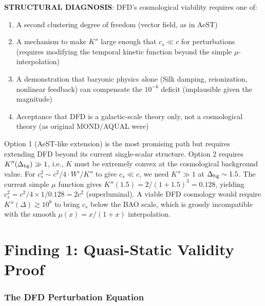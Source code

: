 \documentclass[11pt]{article}
\begin{document}
\begin{tcolorbox}[colback=blue!5!white, colframe=blue!70!black,
  title=\textbf{W4i18 TOP 5 FINDINGS --- QUASI-STATIC REGIME PROOF}]
\begin{enumerate}
  \textbf{STRUCTURAL DIAGNOSIS}: DFD's cosmological viability requires
  one of:
  \begin{enumerate}[nosep]
  \item A second clustering degree of freedom (vector field, as in AeST)
  \item A mechanism to make $K''$ large enough that $c_s \ll c$ for
    perturbations (requires modifying the temporal kinetic function
    beyond the simple $\mu$-interpolation)
  \item A demonstration that baryonic physics alone (Silk damping,
    reionization, nonlinear feedback) can compensate the $10^{-6}$
    deficit (implausible given the magnitude)
  \item Acceptance that DFD is a galactic-scale theory only, not a
    cosmological theory (as original MOND/AQUAL were)
  \end{enumerate}

  Option 1 (AeST-like extension) is the most promising path but
  requires extending DFD beyond its current single-scalar structure.
  Option 2 requires $K''(\Delta_{\rm bg}) \gg 1$, i.e., $K$ must be
  extremely convex at the cosmological background value. For
  $c_s^2 \sim c^2/4 \cdot W'/K''$ to give $c_s \ll c$, we need
  $K'' \gg 1$ at $\Delta_{\rm bg} \sim 1.5$. The current simple
  $\mu$ function gives $K''(1.5) = 2/(1+1.5)^3 = 0.128$, yielding
  $c_s^2 = c^2/4 \times 1/0.128 = 2c^2$ (superluminal). A viable
  DFD cosmology would require $K''(\Delta) \gtrsim 10^6$ to bring
  $c_s$ below the BAO scale, which is grossly incompatible with
  the smooth $\mu(x) = x/(1+x)$ interpolation.

\end{enumerate}
\end{tcolorbox}


\part{Finding 1: Quasi-Static Validity Proof}
\label{part:QS-proof}

\section{The DFD Perturbation Equation}
\end{document}
